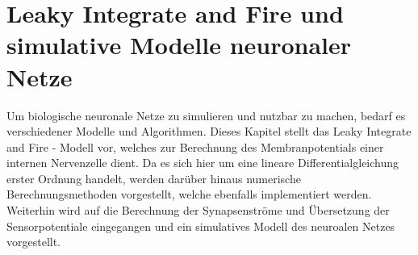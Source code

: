 %
\chapter{Leaky Integrate and Fire und simulative Modelle neuronaler Netze}
\label{chap:lif}
%

	Um biologische neuronale Netze zu simulieren und nutzbar zu machen, bedarf es verschiedener Modelle und Algorithmen. Dieses Kapitel stellt das Leaky Integrate and Fire - Modell vor, welches zur Berechnung des Membranpotentials einer internen Nervenzelle dient. Da es sich hier um eine lineare Differentialgleichung erster Ordnung handelt, werden darüber hinaus numerische Berechnungsmethoden vorgestellt, welche ebenfalls implementiert werden. Weiterhin wird auf die Berechnung der Synapsenströme und Übersetzung der Sensorpotentiale eingegangen und ein simulatives Modell des neuroalen Netzes vorgestellt.

